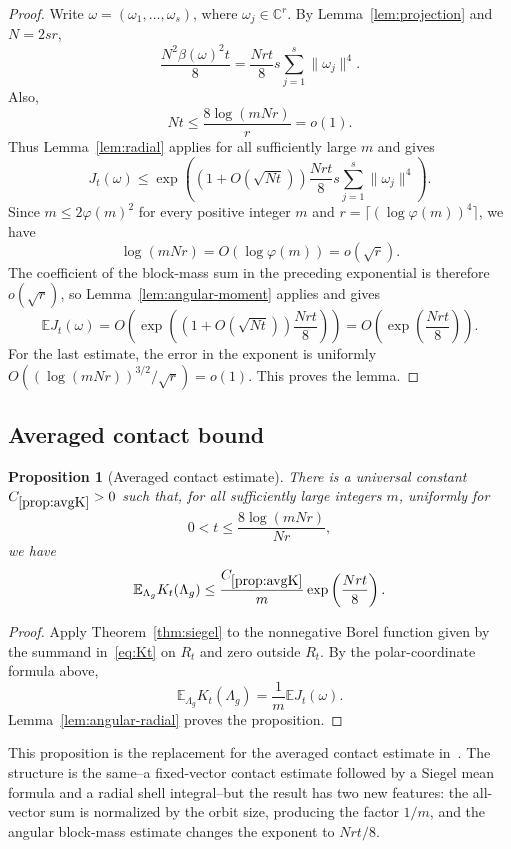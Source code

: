 \documentclass[11pt]{article}
\newtheorem{proposition}[theorem]{Proposition}
\theoremstyle{remark}
\newcommand{\C}{\mathbb C}
\newcommand{\E}{\mathbb E}
\begin{document}
\begin{proof}
Write $\omega=(\omega_1,\dots,\omega_s)$, where $\omega_j\in\C^r$.  By
Lemma~\ref{lem:projection} and $N=2sr$,
\[
        \frac{N^2\beta(\omega)^2t}{8}
        =\frac{Nrt}{8}s\sum_{j=1}^s\|\omega_j\|^4.
\]
Also,
\[
        Nt\le\frac{8\log(mNr)}r=o(1).
\]
Thus Lemma~\ref{lem:radial} applies for all sufficiently large $m$ and gives
\[
        J_t(\omega)\le \exp\left(
        \left(1+O(\sqrt{Nt})\right)
        \frac{Nrt}{8}s\sum_{j=1}^s\|\omega_j\|^4\right).
\]
Since $m\le2\varphi(m)^2$ for every positive integer $m$ and
$r=\lceil(\log\varphi(m))^4\rceil$, we have
\[
        \log(mNr)=O(\log\varphi(m))=o(\sqrt r).
\]
The coefficient of the block-mass sum in the preceding exponential is
therefore $o(\sqrt r)$, so Lemma~\ref{lem:angular-moment} applies and gives
\[
        \E J_t(\omega)
        =O\left(\exp\left(
        \left(1+O(\sqrt{Nt})\right)\frac{Nrt}{8}\right)\right)
        =O\left(\exp\left(\frac{Nrt}{8}\right)\right).
\]
For the last estimate, the error in the exponent is uniformly
$O((\log(mNr))^{3/2}/\sqrt r)=o(1)$.  This proves the lemma.
\end{proof}



\subsection{Averaged contact bound}

\begin{proposition}[Averaged contact estimate]\label{prop:avgK}
There is a universal constant $C_{\ref{prop:avgK}}>0$ such that, for all
sufficiently large integers $m$, uniformly for
\[
        0<t\le\frac{8\log(mNr)}{Nr},
\]
we have
\[
        \E_{\Lambda_g}K_t(\Lambda_g)
        \le \frac{C_{\ref{prop:avgK}}}{m}\exp\left(\frac{Nrt}{8}\right).
\]
\end{proposition}

\begin{proof}
Apply Theorem~\ref{thm:siegel} to the nonnegative Borel function given by the
summand in~\eqref{eq:Kt} on $R_t$ and zero outside $R_t$.  By the
polar-coordinate formula above,
\[
        \E_{\Lambda_g}K_t(\Lambda_g)
        =\frac1m\E J_t(\omega).
\]
Lemma~\ref{lem:angular-radial} proves the proposition.
\end{proof}

This proposition is the replacement for the averaged contact estimate
in~\cite{Klartag}.  The structure is
the same--a fixed-vector contact estimate
followed by a Siegel mean formula and a radial shell integral--but the result
has two new features: the all-vector sum is normalized by the orbit size,
producing the factor $1/m$, and the angular block-mass estimate changes the
exponent to $Nrt/8$.
\end{document}
